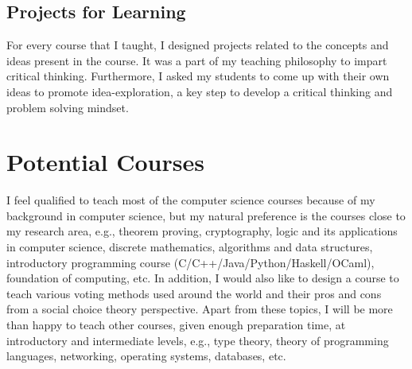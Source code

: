\documentclass[a4paper]{article}
\begin{document}
\subsection{Projects for Learning}
For every course that I taught, I designed projects related to the concepts 
and ideas present in the course. It was a part of my teaching philosophy to impart 
critical thinking. Furthermore, I asked my students to come up with their own ideas to 
promote idea-exploration, a key step to develop a critical thinking and problem solving mindset. 


\section{Potential Courses}
I feel qualified to teach most of the computer science courses 
because of my background in computer science, but 
my natural preference is the courses close to my research 
area, e.g., theorem proving, cryptography, logic 
and its applications in computer science, discrete 
mathematics, algorithms and data structures, 
introductory programming course (C/C++/Java/Python/Haskell/OCaml),
foundation of computing, etc. 
In addition, I would also like to design a course to teach 
various voting methods used around the world and 
their pros and cons from a social choice theory perspective. 
Apart from these topics, I will 
be more than happy to teach other courses, given enough 
preparation time, at introductory and 
intermediate levels, e.g., type theory, theory of programming 
languages, networking, operating systems, databases, etc.


 

\end{document}
